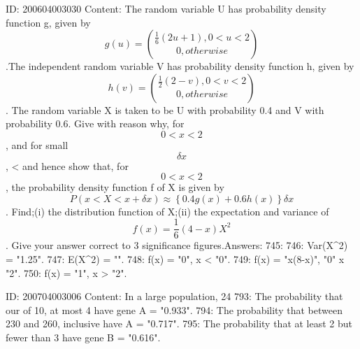 \documentclass{article}
\begin{document}
ID: 200604003030
Content:
The random variable U has probability density function g, given by $$g \left(u\right) = \binom{\frac{1}{6}\left(2u + 1\right),  0 < u < 2}  {0, otherwise} $$.The independent random variable V has probability density function h, given by $$h\left(v\right) = \binom{\frac{1}{2}\left(2 - v\right), 0 < v < 2}{0, otherwise}$$. The random variable X is taken to be U with probability 0.4 and V with probability 0.6. Give with reason why, for $$0 < x < 2$$, and for small $$\delta x$$, <  and hence show that, for $$0 < x < 2$$, the probability density function f of X is given by $$P\left(x < X < x + \delta x \right) \approx \left\{0.4g\left(x\right) + 0.6h\left(x\right)\right\}\delta x$$. Find;(i) the distribution function of X;(ii) the expectation and variance of  $$f\left(x\right) = \frac{1}{6}\left(4 - x\right) X^2$$ . Give your answer correct to 3 significance figures.Answers:
745: 
746: Var(X^2) = "1.25".
747: E(X^2)  = "".
748: f(x) = "0",  x < "0".
749: f(x) = "x(8-x)", "0" \leq x \leq  "2".
750: f(x) = "1", x > "2".

ID: 200704003006
Content:
In a large population, 24%
793: The probability that our of 10, at most 4 have gene A = "0.933".
794: The probability that between 230 and 260, inclusive have A = "0.717".
795: The probability that at least 2 but fewer than 3 have gene B = "0.616".
\end{document}
